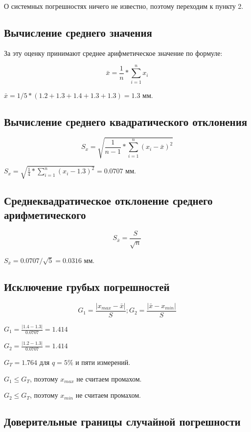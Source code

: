 \documentclass[12pt, a4paper]{article}
\begin{document}
О системных погрешностях ничего не известно, поэтому переходим к пункту 2.

\subsection*{Вычисление среднего значения}

За эту оценку принимают среднее арифметическое значение  по формуле:

$$\bar{x} = \frac{1}{n} * \sum_{i = 1}^{n} x_i$$

$\bar{x} = 1/5 * (1.2 + 1.3 + 1.4 + 1.3 + 1.3) = 1.3$ мм.

\subsection*{Вычисление среднего квадратического отклонения}

$$S_x = \sqrt{\frac{1}{n-1} * \sum_{i = 1}^{n} (x_i - \bar{x})^2}$$

$S_x = \sqrt{\frac{1}{4} * \sum_{i = 1}^{n} (x_i - 1.3)^2} = 0.0707$ мм.

\subsection*{Среднеквадратическое отклонение среднего арифметического}

$$S_{\bar{x}} = \frac{S}{\sqrt{n}}$$

$S_{\bar{x}} = 0.0707 / \sqrt{5} = 0.0316$ мм.

\subsection*{Исключение грубых погрешностей}

$$G_1 = \frac{|x_{max} - \bar{x}|}{S}; G_2 = \frac{|\bar{x} - x_{min}|}{S}$$

$G_1 = \frac{|1.4 - 1.3|}{0.0707} = 1.414$

$G_2 = \frac{|1.2 - 1.3|}{0.0707} = 1.414$

$G_T = 1.764$ для $q = 5\%$ и пяти измерений.

$G_1 \leq G_T$, поэтому $x_{max}$ не считаем промахом.

$G_2 \leq G_T$, поэтому $x_{min}$ не считаем промахом.

\subsection*{Доверительные границы случайной погрешности}
\end{document}
